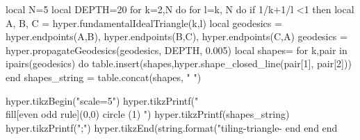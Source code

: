 \documentclass[margin=.2cm,multi,tikz]{standalone}
\begin{document}
\begin{luacode*}
local N=5
local DEPTH=20
for k=2,N do
	for l=k, N do
		if 1/k+1/l <1 then
			local A, B, C = hyper.fundamentalIdealTriangle(k,l)
			local geodesics = {
				{hyper.endpoints(A,B)},
				{hyper.endpoints(B,C)},
				{hyper.endpoints(C,A)}
			}
			geodesics = hyper.propagateGeodesics(geodesics, DEPTH, 0.005)
			local shapes={}
			for k,pair in ipairs(geodesics) do
				table.insert(shapes,hyper.shape_closed_line(pair[1], pair[2]))
			end
			shapes_string = table.concat(shapes, " ")
	
			hyper.tikzBegin("scale=5")
			hyper.tikzPrintf("\\fill[even odd rule](0,0) circle (1) ")
			hyper.tikzPrintf(shapes_string)
			hyper.tikzPrintf(";")
			hyper.tikzEnd(string.format("tiling-triangle-%
		end
	end
end 
\end{luacode*}
\end{document}

